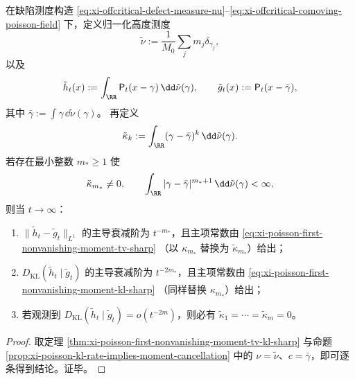 \begin{theorem}\label{thm:xi-poisson-defect-measure-multipole-fingerprint-classification}
在缺陷测度构造
\eqref{eq:xi-offcritical-defect-measure-nu}--\eqref{eq:xi-offcritical-comoving-poisson-field}
下，定义归一化高度测度
\[
\tilde\nu:=\frac1{M_0}\sum_j m_j\delta_{\gamma_j},
\]
以及
\[
\tilde h_t(x):=\int_{\RR}\mathsf P_t(x-\gamma)\,\dd\tilde\nu(\gamma),\qquad
\tilde g_t(x):=\mathsf P_t(x-\bar\gamma),
\]
其中 \(\bar\gamma:=\int \gamma\,\dd\tilde\nu(\gamma)\)。
再定义
\[
\tilde\kappa_k:=\int_{\RR}(\gamma-\bar\gamma)^k\,\dd\tilde\nu(\gamma).
\]
若存在最小整数 \(m_\ast\ge 1\) 使
\[
\tilde\kappa_{m_\ast}\neq 0,\qquad
\int_{\RR}|\gamma-\bar\gamma|^{m_\ast+1}\,\dd\tilde\nu(\gamma)<\infty,
\]
则当 \(t\to\infty\)：
\begin{enumerate}
\item \(\|\tilde h_t-\tilde g_t\|_{L^1}\) 的主导衰减阶为 \(t^{-m_\ast}\)，且主项常数由
\eqref{eq:xi-poisson-first-nonvanishing-moment-tv-sharp}
（以 \(\kappa_{m_\ast}\) 替换为 \(\tilde\kappa_{m_\ast}\)）给出；
\item \(D_{\mathrm{KL}}(\tilde h_t\mid \tilde g_t)\) 的主导衰减阶为 \(t^{-2m_\ast}\)，且主项常数由
\eqref{eq:xi-poisson-first-nonvanishing-moment-kl-sharp}
（同样替换 \(\kappa_{m_\ast}\)）给出；
\item 若观测到
\(
D_{\mathrm{KL}}(\tilde h_t\mid \tilde g_t)=o(t^{-2m})
\)，则必有
\(
\tilde\kappa_1=\cdots=\tilde\kappa_m=0
\)。
\end{enumerate}
\end{theorem}
\begin{proof}
取定理 \ref{thm:xi-poisson-first-nonvanishing-moment-tv-kl-sharp} 与命题
\ref{prop:xi-poisson-kl-rate-implies-moment-cancellation}
中的 \(\nu=\tilde\nu\)、\(c=\bar\gamma\)，即可逐条得到结论。证毕。
\end{proof}

\endinput
